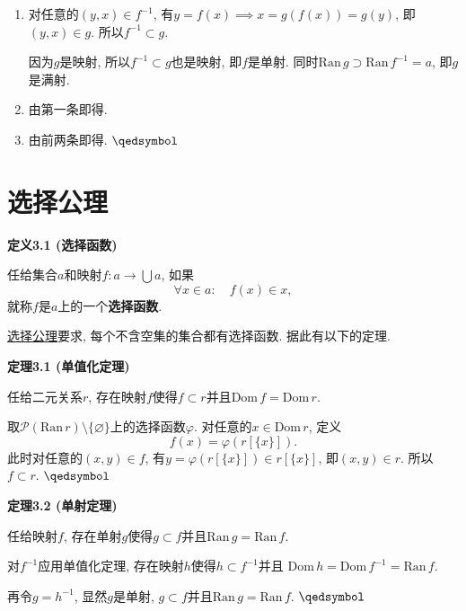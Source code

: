 \documentclass[UTF8]{ctexart}
\begin{document}

\begin{enumerate}
    \item 对任意的$(y,x)\in f^{-1}$, 有$y=f(x)\implies x=g(f(x))=g(y)$,
    即$(y,x)\in g$. 所以$f^{-1}\subset g$.

    \hspace{2.17em}
    因为$g$是映射, 所以$f^{-1}\subset g$也是映射, 即$f$是单射.
    同时$\mathrm{Ran}\,g\supset\mathrm{Ran}\,f^{-1}=a$, 即$g$是满射.

    \item 由第一条即得.
    
    \item 由前两条即得. \hfill $\qedsymbol$
\end{enumerate}





\newpage

\section{选择公理}

\hypertarget{sec:定义3.1}{}
\noindent\textbf{定义3.1 (选择函数)}

任给集合$a$和映射$\displaystyle f:a\to\bigcup a$, 如果
\[
    \forall x\in a:\quad f(x)\in x,
\]
就称$f$是$a$上的一个\textbf{选择函数}.

\vspace{10pt}

\href{../01 ZFC 公理/01 ZFC 公理#nameddest=sec:选择公理}{选择公理}要求,
每个不含空集的集合都有选择函数. 据此有以下的定理.

\vspace{10pt}

\hypertarget{sec:定理3.1}{}
\noindent\textbf{定理3.1 (单值化定理)}

任给二元关系$r$, 存在映射$f$使得$f\subset r$并且$\mathrm{Dom}\,f=\mathrm{Dom}\,r$.


取$\mathcal{P}(\mathrm{Ran}\,r)\setminus\{\varnothing\}$上的选择函数$\varphi$.
对任意的$x\in\mathrm{Dom}\,r$, 定义
\[
    f(x)=\varphi(r[\{x\}]).
\]
此时对任意的$(x,y)\in f$, 有$y=\varphi(r[\{x\}])\in r[\{x\}]$, 即$(x,y)\in r$.
所以$f\subset r$. \hfill $\qedsymbol$

\vspace{10pt}

\hypertarget{sec:定理3.2}{}
\noindent\textbf{定理3.2 (单射定理)}

任给映射$f$, 存在单射$g$使得$g\subset f$并且$\mathrm{Ran}\,g=\mathrm{Ran}\,f$.


对$f^{-1}$应用单值化定理, 存在映射$h$使得$h\subset f^{-1}$并且
$\mathrm{Dom}\,h=\mathrm{Dom}\,f^{-1}=\mathrm{Ran}\,f$.

再令$g=h^{-1}$, 显然$g$是单射, $g\subset f$并且$\mathrm{Ran}\,g=\mathrm{Ran}\,f$.
\hfill $\qedsymbol$
\end{document}

